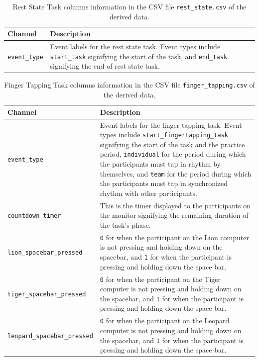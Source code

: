 
\begin{table}
\centering
\begin{tabularx}{\textwidth}{lX}
    \toprule
Channel & Description \\
\midrule
\texttt{event\_type} & Event labels for the rest state task. Event types include \texttt{start\_task} signifying the start of the task, and \texttt{end\_task} signifying the end of rest state task.\\
\bottomrule
\end{tabularx}
\caption{Rest State Task columns information in the CSV file \texttt{rest\_state.csv} of the derived data.}
\label{tab:rest_task_columns}
\end{table}


\begin{table}
\centering
\begin{tabularx}{\textwidth}{lX}
    \toprule
Channel & Description \\
\midrule
\texttt{event\_type} & Event labels for the finger tapping task. Event types include \texttt{start\_fingertapping\_task} signifying the start of the task and the practice period, \texttt{individual} for the period during which the participants must tap in rhythm by themselves, and \texttt{team} for the period during which the participants must tap in synchronized rhythm with other participants.\\
\texttt{countdown\_timer} & This is the timer displayed to the participants on the monitor signifying the remaining duration of the task's phase.\\
\texttt{lion\_spacebar\_pressed} & \texttt{0} for when the participant on the Lion computer is not pressing and holding down on the spacebar, and \texttt{1} for when the participant is pressing and holding down the space bar.\\
\texttt{tiger\_spacebar\_pressed} & \texttt{0} for when the participant on the Tiger computer is not pressing and holding down on the spacebar, and \texttt{1} for when the participant is pressing and holding down the space bar.\\
\texttt{leopard\_spacebar\_pressed} & \texttt{0} for when the participant on the Leopard computer is not pressing and holding down on the spacebar, and \texttt{1} for when the participant is pressing and holding down the space bar.\\
\bottomrule
\end{tabularx}
\caption{Finger Tapping Task columns information in the CSV file \texttt{finger\_tapping.csv} of the derived data.}
\label{tab:finger_task_columns}
\end{table}

